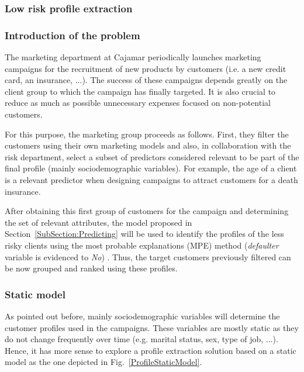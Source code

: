 \subsubsection{Low risk profile extraction}
\subsubsection*{Introduction of the problem}

The marketing department at Cajamar periodically launches marketing campaigns for the recruitment of new products by customers (i.e. a new credit card, an insurance, ...). The success of these campaigns depends greatly on the client group to which the campaign has finally targeted. It is also crucial to reduce as much as possible unnecessary expenses focused on non-potential customers. 

For this purpose, the marketing group proceeds as follows. First, they filter the customers using their own marketing models and also, in collaboration with the risk department, select a subset of predictors considered relevant to be part of the final profile (mainly sociodemographic variables). For example, the age of a client is a relevant predictor when designing campaigns to attract customers for a death insurance. 

After obtaining this first group of customers for the campaign and determining the set of relevant attributes, the model proposed in Section~\ref{SubSection:Predicting} will be used to identify the profiles of the less risky clients using the most probable explanations (MPE) method (\emph{defaulter} variable is evidenced to \emph{No}) . Thus, the target customers previously filtered can be now grouped and ranked using these profiles.


\subsubsection*{Static model}

As pointed out before, mainly sociodemographic variables will determine the customer profiles used in the campaigns. These variables are mostly static as they do not change frequently over time (e.g. marital status, sex, type of job, ...). Hence, it has more sense to explore a profile extraction solution based on a static model as the one depicted in Fig.~\ref{ProfileStaticModel}.

